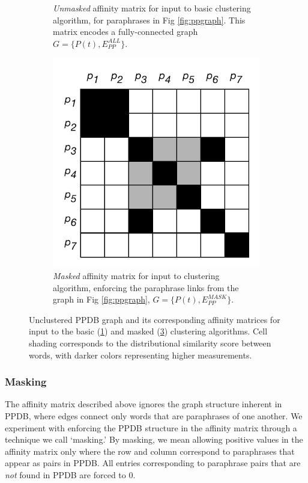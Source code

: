 \documentclass[11pt]{article}
\begin{document}
\begin{figure}
\begin{subfigure}[t]{0.36\textwidth}
		\caption{\textit{Unmasked} affinity matrix for input to basic clustering algorithm, for paraphrases in Fig \ref{fig:ppgraph}. This matrix encodes a fully-connected graph $G = \{P(t), E_{PP}^{ALL}\}$.}
		\label{fig:ppmatall}
	\end{subfigure}
	\hfill%
	\begin{subfigure}[t]{0.36\textwidth}
		\includegraphics[width=\textwidth]{images/pp_mat_mask.pdf}
		\caption{\textit{Masked} affinity matrix for input to clustering algorithm, enforcing the paraphrase links from the graph in Fig \ref{fig:ppgraph}, $G = \{P(t), E_{PP}^{MASK}\}$.}
		\label{fig:ppmatmask}
	\end{subfigure}
	\caption{Unclustered PPDB graph and its corresponding affinity matrices for input to the basic (\ref{fig:ppmatall}) and masked (\ref{fig:ppmatmask}) clustering algorithms. Cell shading corresponds to the distributional similarity score between words, with darker colors representing higher measurements. }
\end{figure}

\subsubsection{Masking}

The affinity matrix described above ignores the graph structure inherent in PPDB, where edges connect only words that are paraphrases of one another. We experiment with enforcing the PPDB structure in the affinity matrix through a technique we call `masking.' By masking, we mean allowing positive values in the affinity matrix only where the row and column correspond to paraphrases that appear as pairs in PPDB. All entries corresponding to paraphrase pairs that are \textit{not} found in PPDB are forced to 0.
\end{document}
